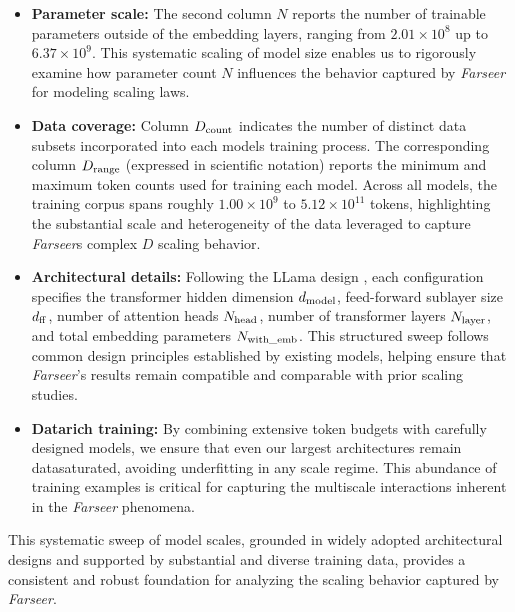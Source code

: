 \documentclass{article}
\begin{document}
\begin{itemize}
  \item \textbf{Parameter scale:}  
    The second column $N$ reports the number of trainable parameters outside of the embedding layers, ranging from $2.01\times10^{8}$ up to $6.37\times10^{9}$.
    This systematic scaling of model size enables us to rigorously examine how parameter count $N$ influences the behavior captured by \textit{Farseer} for modeling scaling laws.

  \item \textbf{Data coverage:}  
    Column $D_{\rm count}$ indicates the number of distinct data subsets incorporated into each models training process. 
    The corresponding column $D_{\rm range}$ (expressed in scientific notation) reports the minimum and maximum token counts used for training each model.
    Across all models, the training corpus spans roughly $1.00\times10^{9}$ to $5.12\times10^{11}$ tokens, highlighting the substantial scale and heterogeneity of the data leveraged to capture \textit{Farseer}s complex $D$ scaling behavior.

  \item \textbf{Architectural details:}  
    Following the LLama design \cite{Touvron2023a,Touvron2023b}, each configuration specifies the transformer hidden dimension $d_{\rm model}$, feed-forward sublayer size $d_{\rm ff}$, number of attention heads $N_{\rm head}$, number of transformer layers $N_{\rm layer}$, and total embedding parameters $N_{\rm with\_emb}$. 
    This structured sweep follows common design principles established by existing models, helping ensure that \textit{Farseer}'s results remain compatible and comparable with prior scaling studies.

  \item \textbf{Data\text{-}rich training:}  
    By combining extensive token budgets with carefully designed models, we ensure that even our largest architectures remain data\text{-}saturated, avoiding under\text{-}fitting in any scale regime.
    This abundance of training examples is critical for capturing the multi\text{-}scale interactions inherent in the \textit{Farseer} phenomena.
\end{itemize}

This systematic sweep of model scales, grounded in widely adopted architectural designs and supported by substantial and diverse training data, provides a consistent and robust foundation for analyzing the scaling behavior captured by \textit{Farseer}.
\end{document}
